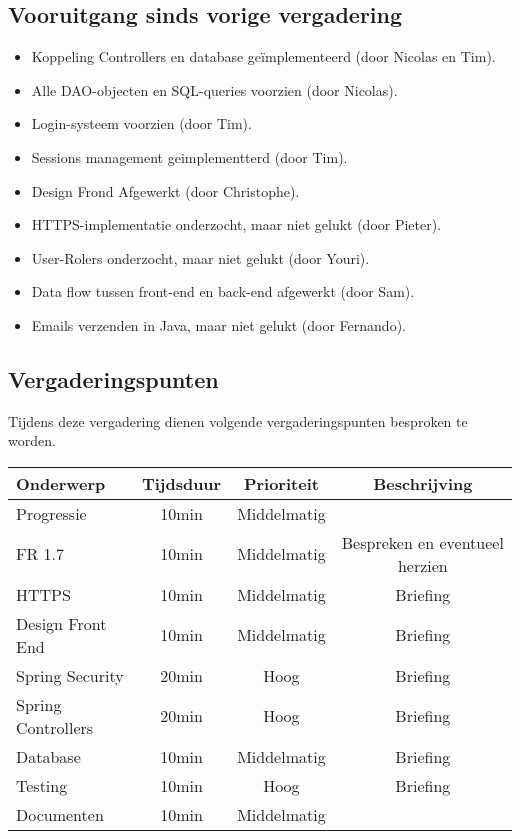 \subsection{Vooruitgang sinds vorige vergadering} \label{sec:Vooruitgang}
\begin{itemize}
	\item Koppeling Controllers en database ge\"{i}mplementeerd (door Nicolas en Tim).
	\item Alle DAO-objecten en SQL-queries voorzien (door Nicolas).
	\item Login-systeem voorzien (door Tim).
	\item Sessions management geimplementterd (door Tim).
	\item Design Frond Afgewerkt (door Christophe).
	\item HTTPS-implementatie onderzocht, maar niet gelukt (door Pieter).
	\item User-Rolers onderzocht, maar niet gelukt (door Youri).
	\item Data flow tussen front-end en back-end afgewerkt (door Sam).
	\item Emails verzenden in Java, maar niet gelukt (door Fernando).
\end{itemize}

\subsection{Vergaderingspunten} 
Tijdens deze vergadering dienen volgende vergaderingspunten besproken te worden.
\begin{table} [H]
	\centering
	\begin{tabular} {l|c|c|c}
		Onderwerp & Tijdsduur & Prioriteit & Beschrijving \\ %
		\hline
		Progressie & 10min & Middelmatig & \\
		FR 1.7 & 10min & Middelmatig & Bespreken en eventueel herzien \\
		HTTPS & 10min & Middelmatig & Briefing \\
		Design Front End & 10min & Middelmatig & Briefing \\
		Spring Security & 20min & Hoog & Briefing \\
		Spring Controllers & 20min & Hoog & Briefing \\
		Database & 10min & Middelmatig & Briefing \\
		Testing & 10min & Hoog & Briefing \\
		Documenten & 10min & Middelmatig & \\
	\end{tabular}
\end{table}

